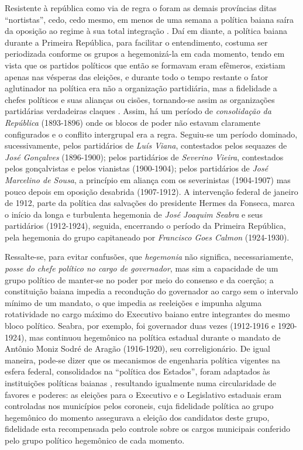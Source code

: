 Resistente à república como via de regra o foram as demais províncias ditas ``nortistas'', cedo, cedo mesmo, em menos de uma semana a política baiana saíra da oposição ao regime à sua total integração \cite{sampaio_legislativo_1985}. Daí em diante, a política baiana durante a Primeira República, para facilitar o entendimento, costuma ser periodizada conforme os grupos a hegemonizá-la em cada momento, tendo em vista que os partidos políticos que então se formavam eram efêmeros, existiam apenas nas vésperas das eleições, e durante todo o tempo restante o fator aglutinador na política era não a organização partidiária, mas a fidelidade a chefes políticos e suas alianças ou cisões, tornando-se assim as organizações partidárias verdadeiras claques \cite[p.~18]{sampaio_partidos_1978}. Assim, há um período de \textit{consolidação da República} (1893-1896) onde os blocos de poder não estavam claramente configurados e o conflito intergrupal era a regra. Seguiu-se um período dominado, sucessivamente, pelos partidários de \textit{Luís Viana}, contestados pelos sequazes de \textit{José Gonçalves} (1896-1900); pelos partidários de \textit{Severino Vieira}, contestados pelos gonçalvistas e pelos vianistas (1900-1904); pelos partidários de \textit{José Marcelino de Sousa}, a princípio em aliança com os severinistas (1904-1907) mas pouco depois em oposição desabrida (1907-1912). A intervenção federal de janeiro de 1912, parte da política das salvações do presidente Hermes da Fonseca, marca o início da longa e turbulenta hegemonia de \textit{José Joaquim Seabra} e seus partidários (1912-1924), seguida, encerrando o período da Primeira República, pela hegemonia do grupo capitaneado por \textit{Francisco Goes Calmon} (1924-1930). 

Ressalte-se, para evitar confusões, que \textit{hegemonia} não significa, necessariamente, \textit{posse do chefe político no cargo de governador}, mas sim a capacidade de um grupo político de manter-se no poder por meio do consenso e da coerção; a constituição baiana impedia a recondução do governador ao cargo sem o intervalo mínimo de um mandato, o que impedia as reeleições e impunha alguma rotatividade no cargo máximo do Executivo baiano entre integrantes do mesmo bloco político. Seabra, por exemplo, foi governador duas vezes (1912-1916 e 1920-1924), mas continuou hegemônico na política estadual durante o mandato de Antônio Moniz Sodré de Aragão (1916-1920), seu correligionário. De igual maneira, pode-se dizer que os mecanismos de engenharia política vigentes na esfera federal, consolidados na ``política dos Estados'', foram adaptados às instituições políticas baianas \cite{sampaio_legislativo_1985}, resultando igualmente numa circularidade de favores e poderes: as eleições para o Executivo e o Legislativo estaduais eram controladas nos municípios pelos coroneis, cuja fidelidade política ao grupo hegemônico do momento assegurava a eleição dos candidatos deste grupo, fidelidade esta recompensada pelo controle sobre os cargos municipais conferido pelo grupo político hegemônico de cada momento.

